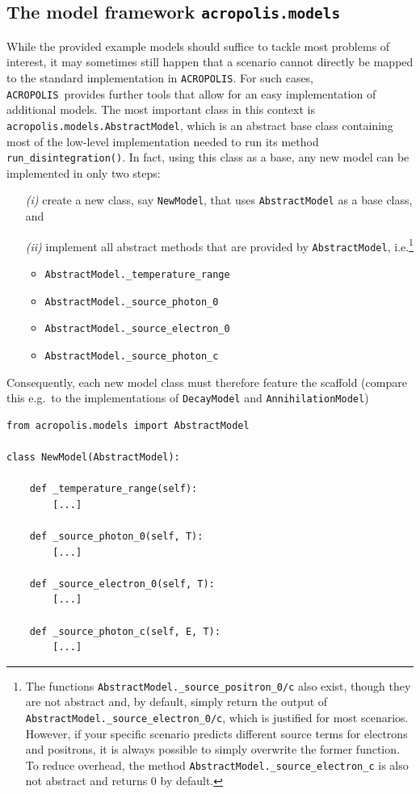 \documentclass[11pt,a4paper]{article}
\newcommand{\acropolis}{\texttt{ACROPOLIS}~}
\begin{document}
\subsection{The model framework \texttt{acropolis.models}}
While the provided example models should suffice to tackle most problems of interest, it may sometimes still happen that a scenario cannot directly be mapped to the standard implementation in \texttt{ACROPOLIS}. For such cases, \acropolis provides further tools that allow for an easy implementation of additional models.
The most important class in this context is \texttt{acropolis.models.AbstractModel}, which is an abstract base class containing most of the low-level implementation needed to run its method \texttt{run\_disintegration()}. In fact, using this class as a base, any new model can be implemented in only two steps:
\begin{enumerate}
\item[\textit{(i)}] create a new class, say \texttt{NewModel}, that uses \texttt{AbstractModel} as a base class, and
\item[\textit{(ii)}]  implement all abstract methods that are provided by \texttt{AbstractModel}, i.e.\footnote{The functions \texttt{AbstractModel.\_source\_positron\_0/c} also exist, though they are not abstract and, by default, simply return the output of \texttt{AbstractModel.\_source\_electron\_0/c}, which is justified for most scenarios. However, if your specific scenario predicts different source terms for electrons and positrons, it is always possible to simply overwrite the former function. To reduce overhead, the method \texttt{AbstractModel.\_source\_electron\_c} is also not abstract and returns 0 by default.}
\begin{itemize}
	\item \texttt{AbstractModel.\_temperature\_range}
	\item \texttt{AbstractModel.\_source\_photon\_0}
	\item \texttt{AbstractModel.\_source\_electron\_0}
	\item \texttt{AbstractModel.\_source\_photon\_c}
\end{itemize}
\end{enumerate}
Consequently, each new model class must therefore feature the scaffold (compare this e.g.\ to the implementations of \texttt{DecayModel} and \texttt{AnnihilationModel})
\begin{lstlisting}
from acropolis.models import AbstractModel

class NewModel(AbstractModel):

	def _temperature_range(self):
		[...]

	def _source_photon_0(self, T):
		[...]

	def _source_electron_0(self, T):
		[...]

	def _source_photon_c(self, E, T):
		[...]

\end{lstlisting}
\end{document}
